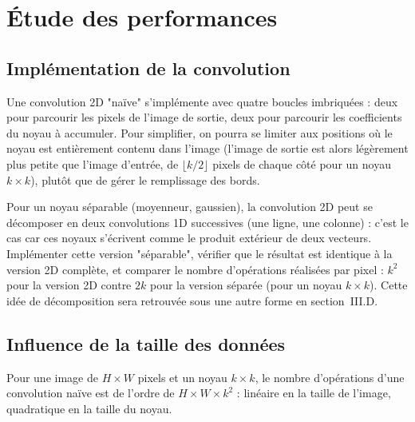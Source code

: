\section{Étude des performances}

\subsection{Implémentation de la convolution}

Une convolution 2D "naïve" s'implémente avec quatre boucles imbriquées : deux pour parcourir les pixels de l'image de sortie, deux pour parcourir les coefficients du noyau à accumuler. Pour simplifier, on pourra se limiter aux positions où le noyau est entièrement contenu dans l'image (l'image de sortie est alors légèrement plus petite que l'image d'entrée, de $\lfloor k/2\rfloor$ pixels de chaque côté pour un noyau $k\times k$), plutôt que de gérer le remplissage des bords. \\

% 



\begin{shortcut}
Pour un noyau séparable (moyenneur, gaussien), la convolution 2D peut se décomposer en deux convolutions 1D successives (une ligne, une colonne) : c'est le cas car ces noyaux s'écrivent comme le produit extérieur de deux vecteurs. Implémenter cette version "séparable", vérifier que le résultat est identique à la version 2D complète, et comparer le nombre d'opérations réalisées par pixel : $k^2$ pour la version 2D contre $2k$ pour la version séparée (pour un noyau $k\times k$). Cette idée de décomposition sera retrouvée sous une autre forme en section~III.D.
\end{shortcut}

\subsection{Influence de la taille des données}

Pour une image de $H\times W$ pixels et un noyau $k\times k$, le nombre d'opérations d'une convolution naïve est de l'ordre de $H\times W\times k^2$ : linéaire en la taille de l'image, quadratique en la taille du noyau. \\

